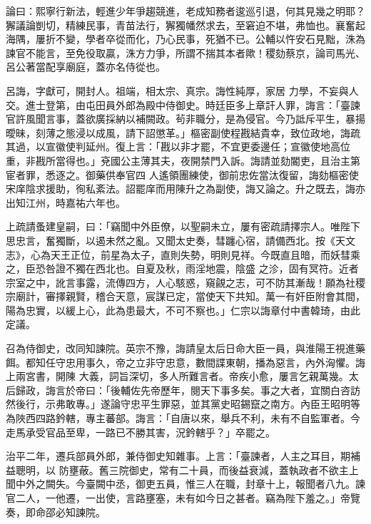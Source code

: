 \begin{pinyinscope}
 論曰：熙寧行新法，輕進少年爭趨競進，老成知務者逡巡引退，何其見幾之明耶？獬議論剴切，精練民事，青苗法行，獬獨幡然求去，至窘迫不堪，弗恤也。襄奮起海隅，屢折不變，學者卒從而化，乃心民事，死猶不已。公輔以忤安石見黜，洙為諫官不能言，至免役取贏，洙方力爭，所謂不揣其本者歟！稷劾蔡京，論司馬光、呂公著當配享廟庭，蓋亦名侍從也。



 呂誨，字獻可，開封人。祖端，相太宗、真宗。誨性純厚，家居
 力學，不妄與人交。進士登第，由屯田員外郎為殿中侍御史。時廷臣多上章訐人罪，誨言：「臺諫官許風聞言事，蓋欲廣採納以補闕政。茍非職分，是為侵官。今乃詆斥平生，暴揚曖昧，刻薄之態浸以成風，請下詔懲革。」樞密副使程戡結貴幸，致位政地，誨疏其過，以宣徽使判延州。復上言：「戡以非才罷，不宜更委邊任；宣徽使地高位重，非戡所當得也。」兗國公主薄其夫，夜開禁門入訴。誨請並劾閽吏，且治主第宦者罪，悉逐之。御藥供奉官四
 人遙領團練使，御前忠佐當汰復留，誨劾樞密使宋庠陰求援助，徇私紊法。詔罷庠而用陳升之為副使，誨又論之。升之既去，誨亦出知江州，時嘉祐六年也。



 上疏請蚤建皇嗣，曰：「竊聞中外臣僚，以聖嗣未立，屢有密疏請擇宗人。唯陛下思忠言，奮獨斷，以遏未然之亂。又聞太史奏，彗躔心宿，請備西北。按《天文志》，心為天王正位，前星為太子，直則失勢，明則見祥。今既直且暗，而妖彗乘之，臣恐咎證不獨在西北也。自夏及秋，雨淫地震，陰盛
 之沴，固有冥符。近者宗室之中，訛言事露，流傳四方，人心駭惑，窺覦之志，可不防其漸哉！願為社稷宗廟計，審擇親賢，稽合天意，宸謀已定，當使天下共知。萬一有奸臣附會其間，陽為忠實，以緩上心，此為患最大，不可不察也。」仁宗以誨章付中書韓琦，由此定議。



 召為侍御史，改同知諫院。英宗不豫，誨請皇太后日命大臣一員，與淮陽王視進藥餌。都知任守忠用事久，帝之立非守忠意，數間諜東朝，播為惡言，內外洶懼。誨上兩宮書，開陳
 大義，詞旨深切，多人所難言者。帝疾小愈，屢言乞親萬幾。太后歸政，誨言於帝曰：「後輔佐先帝歷年，閱天下事多矣。事之大者，宜關白咨訪然後行，示弗敢專。」遂論守忠平生罪惡，並其黨史昭錫竄之南方。內臣王昭明等為陜西四路鈐轄，專主蕃部。誨言：「自唐以來，舉兵不利，未有不自監軍者。今走馬承受官品至卑，一路已不勝其害，況鈐轄乎？」卒罷之。



 治平二年，遷兵部員外郎，兼侍御史知雜事。上言：「臺諫者，人主之耳目，期補益聰明，以
 防壅蔽。舊三院御史，常有二十員，而後益衰減，蓋執政者不欲主上聞中外之闕失。今臺闕中丞，御吏五員，惟三人在職，封章十上，報聞者八九。諫官二人，一他遷，一出使，言路壅塞，未有如今日之甚者。竊為陛下羞之。」帝覽奏，即命邵必知諫院。




\end{pinyinscope}
